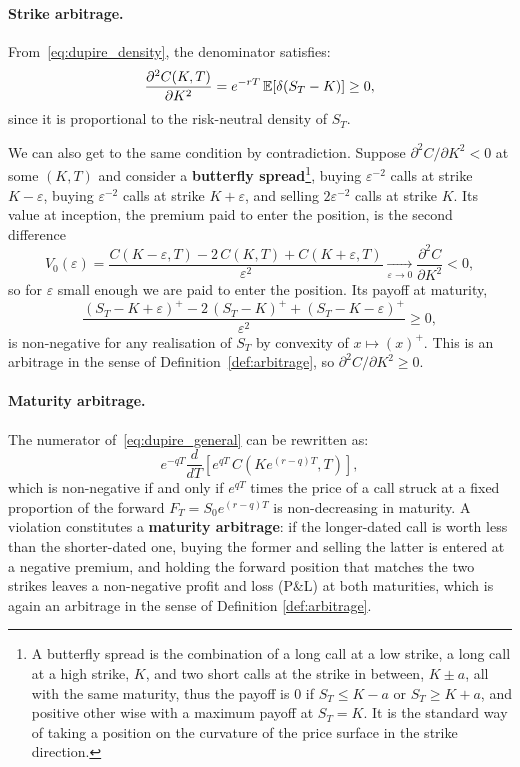 \paragraph{Strike arbitrage.}
From~\eqref{eq:dupire_density}, the denominator satisfies:
\begin{equation*}
    \frac{\partial^2 C(K,T)}{\partial K^2} = e^{-rT}\,\mathbb{E}\!\left[\delta(S_T - K)\right] \geq 0,
\end{equation*}
since it is proportional to the risk-neutral density of $S_T$.

We can also get to the same condition by contradiction.
Suppose $\partial^2 C/\partial K^2 < 0$ at some $(K, T)$ and consider a
\textbf{butterfly spread}\footnote{
    A butterfly spread is the combination of a long call at a low strike,
    a long call at a high strike, $K$,
    and two short calls at the strike in between, $K \pm a$,
    all with the same maturity,
    thus the payoff is $0$ if $S_T \leq K - a$ or $S_T \geq K + a$,
    and positive other wise with a maximum payoff at $S_T = K$.
    It is the standard way of taking a position on the curvature of the price surface
    in the strike direction.
}, buying $\varepsilon^{-2}$ calls at strike $K-\varepsilon$,
buying $\varepsilon^{-2}$ calls at strike $K+\varepsilon$,
and selling $2\varepsilon^{-2}$ calls at strike $K$.
Its value at inception, the premium paid to enter the position, is the second difference
\begin{equation*}
    V_0(\varepsilon)
        = \frac{C(K-\varepsilon, T) - 2\,C(K, T) + C(K+\varepsilon, T)}{\varepsilon^2}
        \xrightarrow[\varepsilon \to 0]{} \frac{\partial^2 C}{\partial K^2} < 0,
\end{equation*}
so for $\varepsilon$ small enough we are paid to enter the position.
Its payoff at maturity,
\begin{equation*}
    \frac{(S_T - K + \varepsilon)^+ - 2\,(S_T - K)^+ + (S_T - K - \varepsilon)^+}{\varepsilon^2}
    \geq 0,
\end{equation*}
is non-negative for any realisation of $S_T$ by convexity of $x \mapsto (x)^+$.
This is an arbitrage in the sense of Definition~\ref{def:arbitrage},
so $\partial^2 C/\partial K^2 \geq 0$.

\paragraph{Maturity arbitrage.}
The numerator of~\eqref{eq:dupire_general} can be rewritten as:
\begin{equation*}
    e^{-qT}\frac{d}{dT}\!\left[e^{qT}\,C\!\left(K e^{(r-q)T}, T\right)\right],
\end{equation*}
which is non-negative if and only if $e^{qT}$ times the price of a call struck at
a fixed proportion of the forward $F_T = S_0 e^{(r-q)T}$ is non-decreasing in maturity.
A violation constitutes a \textbf{maturity arbitrage}:
if the longer-dated call is worth less than the shorter-dated one,
buying the former and selling the latter is entered at a negative premium,
and holding the forward position that matches the two strikes leaves a non-negative
profit and loss (P\&L) at both maturities,
which is again an arbitrage in the sense of Definition \ref{def:arbitrage}.

